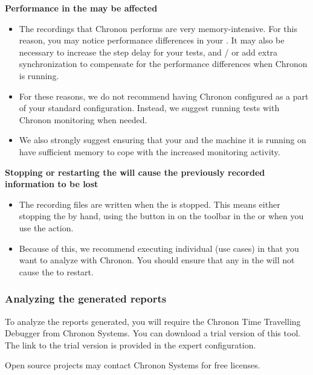 \textbf{Performance in the \gdaut{} may be affected}
\begin{itemize}
\item The recordings that Chronon performs are very memory-intensive. For this reason, you may notice performance differences in your \gdaut{}. It may also be necessary to increase the step delay for your tests, and / or add extra synchronization to compensate for the performance differences when Chronon is running. 
\item For these reasons, we do not recommend having Chronon configured as a part of your standard \gdaut{} configuration. Instead, we suggest running tests with Chronon monitoring when needed. 
\item We also strongly suggest ensuring that your \gdaut{} and the machine it is running on have sufficient memory to cope with the increased monitoring activity.
\end{itemize}

\textbf{Stopping or restarting the \gdaut{} will cause the previously recorded information to be lost}
\begin{itemize}
\item The recording files are written when the \gdaut{} is stopped. This means either stopping the \gdaut{} by hand, using the  button in on the toolbar in the \ite{} or when you use the  action. 
\item Because of this, we recommend executing individual \gdcases{} (use cases) in \gdsuites{} that you want to analyze with Chronon. You should ensure that any \gdehandlers{} in the \gdsuite{} will not cause the \gdaut{} to restart.
\end{itemize}




\subsubsection{Analyzing the generated reports}
\label{TasksChrononTools}
To analyze the reports generated, you will require the Chronon Time Travelling Debugger from Chronon Systems. You can download a trial version of this tool. The link to the trial version is provided in the expert \gdaut{} configuration.

Open source projects may contact Chronon Systems for free licenses. 


